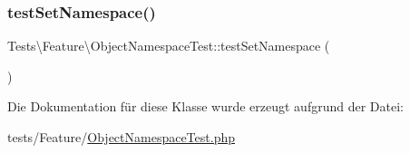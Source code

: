 \subsubsection{\texorpdfstring{test\+Set\+Namespace()}{testSetNamespace()}}
{\footnotesize\ttfamily Tests\textbackslash{}\+Feature\textbackslash{}\+Object\+Namespace\+Test\+::test\+Set\+Namespace (\begin{DoxyParamCaption}{ }\end{DoxyParamCaption})}



Die Dokumentation für diese Klasse wurde erzeugt aufgrund der Datei\+:\begin{DoxyCompactItemize}
\item 
tests/\+Feature/\hyperlink{ObjectNamespaceTest_8php}{Object\+Namespace\+Test.\+php}\end{DoxyCompactItemize}
